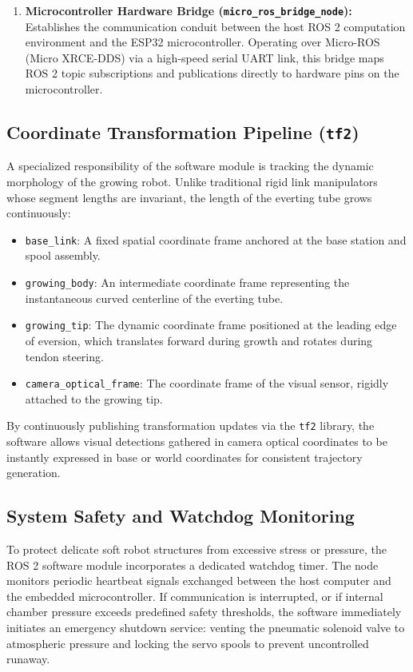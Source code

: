 \begin{enumerate}
    \item \textbf{Microcontroller Hardware Bridge (\texttt{micro\_ros\_bridge\_node}):} Establishes the communication conduit between the host ROS 2 computation environment and the ESP32 microcontroller. Operating over Micro-ROS (Micro XRCE-DDS) via a high-speed serial UART link, this bridge maps ROS 2 topic subscriptions and publications directly to hardware pins on the microcontroller.
\end{enumerate}

\subsection{Coordinate Transformation Pipeline (\texttt{tf2})}
A specialized responsibility of the software module is tracking the dynamic morphology of the growing robot. Unlike traditional rigid link manipulators whose segment lengths are invariant, the length of the everting tube grows continuously:
\begin{itemize}
    \item \texttt{base\_link}: A fixed spatial coordinate frame anchored at the base station and spool assembly.
    \item \texttt{growing\_body}: An intermediate coordinate frame representing the instantaneous curved centerline of the everting tube.
    \item \texttt{growing\_tip}: The dynamic coordinate frame positioned at the leading edge of eversion, which translates forward during growth and rotates during tendon steering.
    \item \texttt{camera\_optical\_frame}: The coordinate frame of the visual sensor, rigidly attached to the growing tip.
\end{itemize}
By continuously publishing transformation updates via the \texttt{tf2} library, the software allows visual detections gathered in camera optical coordinates to be instantly expressed in base or world coordinates for consistent trajectory generation.

\subsection{System Safety and Watchdog Monitoring}
To protect delicate soft robot structures from excessive stress or pressure, the ROS 2 software module incorporates a dedicated watchdog timer. The node monitors periodic heartbeat signals exchanged between the host computer and the embedded microcontroller. If communication is interrupted, or if internal chamber pressure exceeds predefined safety thresholds, the software immediately initiates an emergency shutdown service: venting the pneumatic solenoid valve to atmospheric pressure and locking the servo spools to prevent uncontrolled runaway.

